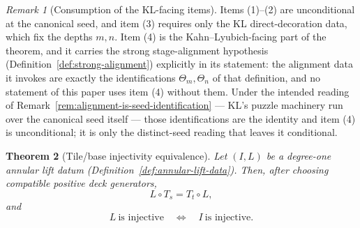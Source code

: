\documentclass[11pt,reqno]{amsart}
\newtheorem{theorem}{Theorem}[section]
\theoremstyle{definition}
\theoremstyle{remark}
\newtheorem{remark}[theorem]{Remark}
\begin{document}
\begin{remark}[Consumption of the KL-facing items]
\label{rem:propagation-alignment}
Items (1)--(2) are unconditional at the canonical seed, and item (3)
requires only the KL direct-decoration data, which fix the depths
\(m,n\).  Item (4) is the Kahn--Lyubich-facing part of the theorem,
and it carries the strong stage-alignment hypothesis
(Definition~\ref{def:strong-alignment}) explicitly in its statement:
the alignment data it invokes are exactly the identifications
\(\Theta_m,\Theta_n\) of that definition, and no statement of this
paper uses item (4) without them.  Under the intended reading of
Remark~\ref{rem:alignment-is-seed-identification} --- KL's puzzle
machinery run over the canonical seed itself --- those identifications
are the identity and item (4) is unconditional; it is only the
distinct-seed reading that leaves it conditional.
\end{remark}
\begin{theorem}[Tile/base injectivity equivalence]
\label{thm:tile-base-equivalence}
Let \((I,L)\) be a degree-one annular lift datum
(Definition~\ref{def:annular-lift-data}).  Then, after choosing
compatible positive deck generators,
\[
 L\circ T_s=T_t\circ L,
\]
and
\[
 L\ \text{is injective}
 \quad\Longleftrightarrow\quad
 I\ \text{is injective}.
\]
\end{theorem}
\end{document}
